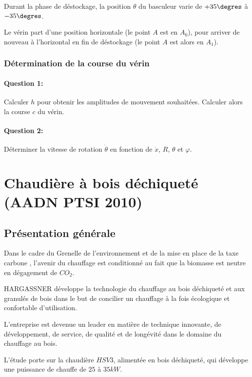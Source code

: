 Durant la phase de déstockage, la position $\theta$ du basculeur varie de $+35\degres$ à $-35\degres$.

Le vérin part d'une position horizontale (le point $A$ est en $A_0$), pour arriver de nouveau à l'horizontal en fin de déstockage (le point $A$ est alors en $A_1$).

\subsubsection{Détermination de la course du vérin}

\paragraph{Question 1:} Calculer $h$ pour obtenir les amplitudes de mouvement souhaitées. Calculer alors la course $c$ du vérin.

\paragraph{Question 2:} Déterminer la vitesse de rotation $\dot{\theta}$ en fonction de $\dot{x}$, $R$, $\theta$ et $\varphi$.

\newpage

\section{Chaudière à bois déchiqueté (AADN PTSI 2010)}

\subsection{Présentation générale}

Dans le cadre du \og Grenelle de l'environnement \fg et de la mise en place de la \og taxe carbone \fg, l'avenir du chauffage est conditionné au fait que la biomasse est neutre en dégagement de $CO_2$.

HARGASSNER développe la technologie du chauffage au bois déchiqueté et aux granulés de bois dans le but de concilier un chauffage à la fois écologique et confortable d'utilisation.

L'entreprise est devenue un leader en matière de technique innovante, de développement, de service, de qualité et de longévité dans le domaine du chauffage au bois.

L'étude porte sur la chaudière $HSV 3$, alimentée en bois déchiqueté, qui développe une puissance de chauffe de $25$ à $35 kW$.

